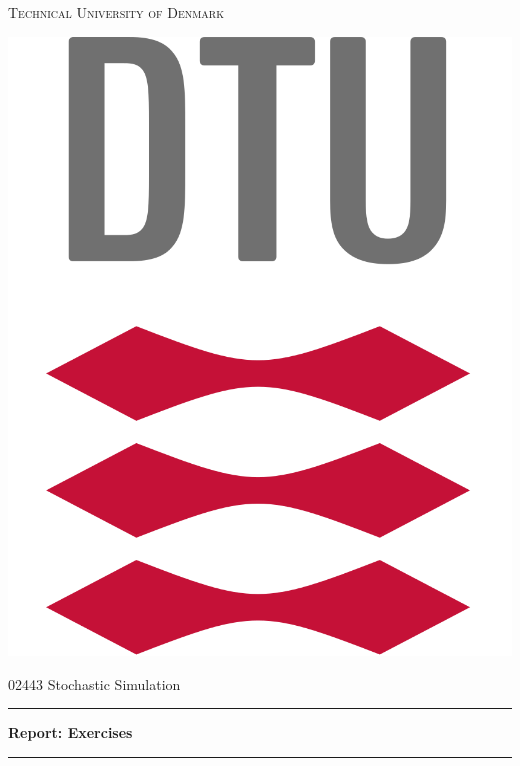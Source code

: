 \title{}

\newcommand\HRule{\noindent\rule{\linewidth}{0.8pt}}
\begin{titlepage}

\thispagestyle{empty}

\begin{center}
\textsc{\large Technical University of Denmark}\\[0.5cm]


\begin{minipage}{1.9cm}
\includegraphics[width=1.2\textwidth]{Figures/dtu_logo.png}
\end{minipage}
\end{center}
\vspace{1.cm}

\begin{center}
{\Large 02443 Stochastic Simulation} \\ [0.5cm]
\end{center}


\HRule

\begin{center}
\bfseries
{\huge Report: Exercises \\}
\vspace{1cm}
\end{center}
\HRule


\end{titlepage}
